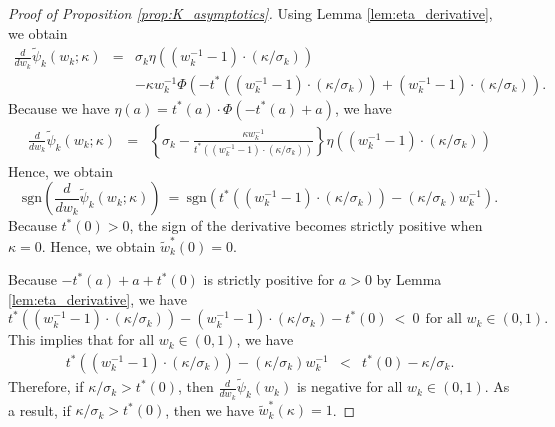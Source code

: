 \documentclass[12pt,a4paper]{article}
\begin{document}
\begin{proof}[Proof of Proposition \ref{prop:K_asymptotics}]
Using Lemma \ref{lem:eta_derivative}, we obtain
\begin{eqnarray}
\frac{d}{d w_k} \tilde{\psi}_k(w_k;\kappa) &=& \sigma_k \eta \left( (w_k^{-1} - 1) \cdot (\kappa/\sigma_k) \right) \nonumber \\
& & - \kappa w_k^{-1} \Phi\left(-t^{\ast}((w_k^{-1} - 1) \cdot (\kappa/\sigma_k) ) + (w_k^{-1} - 1) \cdot (\kappa / \sigma_k ) \right). \nonumber
\end{eqnarray}
Because we have $\eta(a) = t^{\ast}(a) \cdot \Phi(-t^{\ast}(a)+a)$, we have
\begin{eqnarray*}
\frac{d}{d w_k} \tilde{\psi}_k(w_k;\kappa) &=& \left\{ \sigma_k  - \frac{\kappa w_k^{-1}}{t^{\ast}((w_k^{-1} - 1) \cdot (\kappa/\sigma_k) )} \right\} \eta \left( (w_k^{-1} - 1) \cdot (\kappa/\sigma_k) \right)
\end{eqnarray*}
Hence, we obtain
\begin{equation}
\mathrm{sgn} \left( \frac{d}{d w_k} \tilde{\psi}_k(w_k ; \kappa) \right) \ = \ \mathrm{sgn} \left( t^{\ast}\left( (w_k^{-1} - 1) \cdot (\kappa/\sigma_k) \right) - (\kappa/\sigma_k) w_k^{-1} \right).\label{sign_tilde_psi}
\end{equation}
Because $t^{\ast}(0) > 0$, the sign of the derivative becomes strictly positive when $\kappa=0$. Hence, we obtain $\tilde{w}_k^{\ast}(0) = 0$.

Because $-t^{\ast}(a) + a + t^{\ast}(0)$ is strictly positive for $a > 0$ by Lemma \ref{lem:eta_derivative}, we have
$$
t^{\ast}\left( (w_k^{-1} - 1) \cdot (\kappa/\sigma_k) \right) - (w_k^{-1} - 1) \cdot (\kappa/\sigma_k) - t^{\ast}(0) \ < \ 0 \ \ \text{for all $w_k \in (0,1)$.}
$$
This implies that for all $w_k \in (0,1)$, we have
\begin{eqnarray*}
 t^{\ast}\left( (w_k^{-1} - 1) \cdot (\kappa/\sigma_k) \right) - (\kappa/\sigma_k) w_k^{-1} & < & t^{\ast}(0) - \kappa/ \sigma_k.
\end{eqnarray*}
Therefore, if $\kappa/\sigma_k > t^{\ast}(0)$, then $\frac{d}{d w_k} \tilde{\psi}_k(w_k)$ is negative for all $w_k \in (0,1)$. As a result, if $\kappa/\sigma_k > t^{\ast}(0)$, then we have $\tilde{w}_k^{\ast}(\kappa) = 1$.
\end{proof}\vspace{0.1in}
\end{document}
